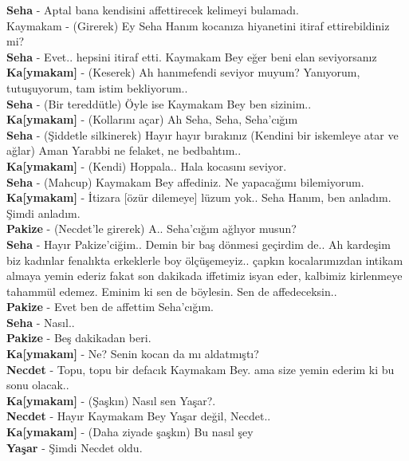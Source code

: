 \documentclass[]{book}
\begin{document}
\textbf{Seha} - Aptal bana kendisini affettirecek kelimeyi bulamadı.\\
Kaymakam - (Girerek) Ey Seha Hanım kocanıza hiyanetini itiraf ettirebildiniz mi?\\
\textbf{Seha} - Evet.. hepsini itiraf etti. Kaymakam Bey eğer beni elan seviyorsanız\\
\textbf{Ka{[}ymakam{]}} - (Keserek) Ah hanımefendi seviyor muyum? Yanıyorum, tutuşuyorum, tam istim bekliyorum..\\
\textbf{Seha} - (Bir tereddütle) Öyle ise Kaymakam Bey ben sizinim..\\
\textbf{Ka{[}ymakam{]}} - (Kollarını açar) Ah Seha, Seha, Seha'cığım\\
\textbf{Seha} - (Şiddetle silkinerek) Hayır hayır bırakınız (Kendini bir iskemleye atar ve ağlar) Aman Yarabbi ne felaket, ne bedbahtım..\\
\textbf{Ka{[}ymakam{]}} - (Kendi) Hoppala.. Hala kocasını seviyor.\\
\textbf{Seha} - (Mahcup) Kaymakam Bey affediniz. Ne yapacağımı bilemiyorum.\\
\textbf{Ka{[}ymakam{]}} - İtizara {[}özür dilemeye{]} lüzum yok.. Seha Hanım, ben anladım. Şimdi anladım.\\
\textbf{Pakize} - (Necdet'le girerek) A.. Seha'cığım ağlıyor musun?\\
\textbf{Seha} - Hayır Pakize'ciğim.. Demin bir baş dönmesi geçirdim de.. Ah kardeşim biz kadınlar fenalıkta erkeklerle boy ölçüşemeyiz.. çapkın kocalarımızdan intikam almaya yemin ederiz fakat son dakikada iffetimiz isyan eder, kalbimiz kirlenmeye tahammül edemez. Eminim ki sen de böylesin. Sen de affedeceksin..\\
\textbf{Pakize} - Evet ben de affettim Seha'cığım.\\
\textbf{Seha} - Nasıl..\\
\textbf{Pakize} - Beş dakikadan beri.\\
\textbf{Ka{[}ymakam{]}} - Ne? Senin kocan da mı aldatmıştı?\\
\textbf{Necdet} - Topu, topu bir defacık Kaymakam Bey. ama size yemin ederim ki bu sonu olacak..\\
\textbf{Ka{[}ymakam{]}} - (Şaşkın) Nasıl sen Yaşar?.\\
\textbf{Necdet} - Hayır Kaymakam Bey Yaşar değil, Necdet..\\
\textbf{Ka{[}ymakam{]}} - (Daha ziyade şaşkın) Bu nasıl şey\\
\textbf{Yaşar} - Şimdi Necdet oldu.\\
\end{document}
